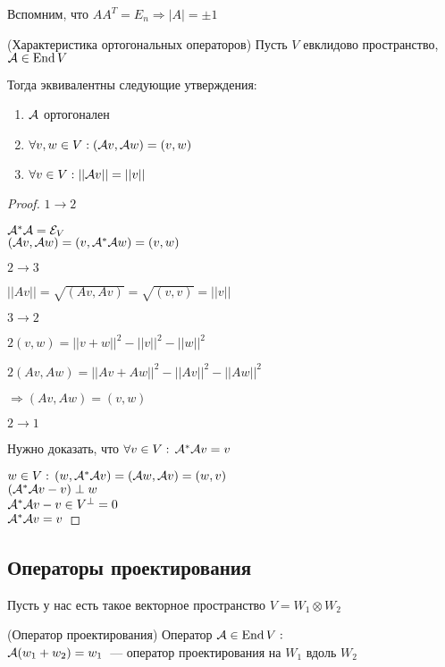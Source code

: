 Вспомним, что $AA^T = E_n \Longrightarrow |A| = \pm 1$

\begin{theorem}(Характеристика ортогональных операторов)
    Пусть $V$ евклидово пространство, $\mathcal{A} \in \operatorname{End}{V}$ 

    Тогда эквивалентны следующие утверждения:
    \begin{enumerate}
        \item $\mathcal{A}$ ортогонален
        \item $\forall v, w \in V: (\mathcal{A} v, \mathcal{A} w) = (v, w)$
        \item $\forall v \in V: ||\mathcal{A} v|| = || v || $
    \end{enumerate}
    \begin{proof}
        $1 \to 2$

        $\mathcal{A}^* \mathcal{A} = \mathcal{E}_V$ \\
        $(\mathcal{A} v, \mathcal{A} w) = (v, \mathcal{A}^*\mathcal{A} w) = (v, w)$

        $2 \to 3 $

        $||Av|| = \sqrt{(Av, Av)} = \sqrt{(v, v)} = ||v||$

        $3 \to 2$
        
        $2(v, w) = ||v + w||^2 - ||v||^2 - ||w||^2$

        $2(Av, Aw) = ||Av + Aw||^2 - ||Av||^2 - ||Aw||^2$
        
        $\Longrightarrow (Av, Aw) = (v, w)$

        $2 \to 1$

        Нужно доказать, что $\forall v \in V: \, \mathcal{A}^* \mathcal{A} v = v$

        $w \in V: \, (w, \mathcal{A}^* \mathcal{A} v) = (\mathcal{A} w, \mathcal{A} v) = (w, v)$ \\
        $(\mathcal{A}^* \mathcal{A} v - v) \perp w$ \\
        $\mathcal{A}^* \mathcal{A} v - v \in V^{\perp} = 0$ \\
        $\mathcal{A}^* \mathcal{A} v = v$
    \end{proof}    
\end{theorem}


\subsection{Операторы проектирования}

Пусть у нас есть такое векторное пространство $V = W_1 \otimes W_2$

\begin{conj}(Оператор проектирования)
    Оператор $\mathcal{A} \in \operatorname{End}{V}:$ \\
    $\mathcal{A}(w_1 + w_2) = w_1$~--- оператор проектирования на $W_1$ вдоль $W_2$
\end{conj}

